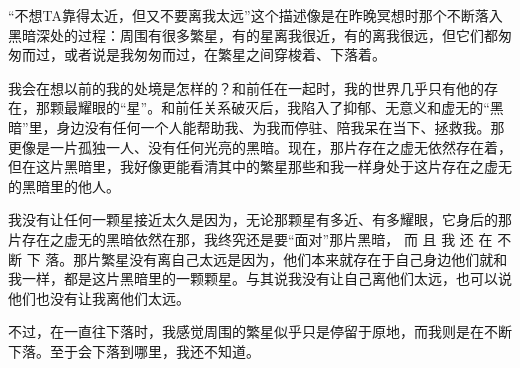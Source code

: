 “不想TA靠得太近，但又不要离我太远”这个描述像是在昨晚冥想时那个不断落入黑暗深处的过程：周围有很多繁星，有的星离我很近，有的离我很远，但它们都匆匆而过，或者说是我匆匆而过，在繁星之间穿梭着、下落着。

我会在想以前的我的处境是怎样的？和前任在一起时，我的世界几乎只有他的存在，那颗最耀眼的“星”。和前任关系破灭后，我陷入了抑郁、无意义和虚无的“黑暗”里，身边没有任何一个人能帮助我、为我而停驻、陪我呆在当下、拯救我。那更像是一片孤独一人、没有任何光亮的黑暗。现在，那片存在之虚无依然存在着，但在这片黑暗里，我好像更能看清其中的繁星\pozhehao{}那些和我一样身处于这片存在之虚无的黑暗里的他人。

我没有让任何一颗星接近太久是因为，无论那颗星有多近、有多耀眼，它身后的那片存在之虚无的黑暗依然在那，我终究还是要“面对”那片黑暗， 而 且 我 还 在 不 断 下 落。那片繁星没有离自己太远是因为，他们本来就存在于自己身边\pozhehao{}他们就和我一样，都是这片黑暗里的一颗颗星。与其说我没有让自己离他们太远，也可以说他们也没有让我离他们太远。

不过，在一直往下落时，我感觉周围的繁星似乎只是停留于原地，而我则是在不断下落。至于会下落到哪里，我还不知道。
